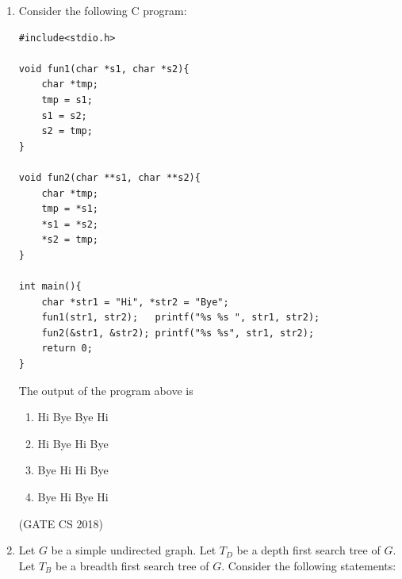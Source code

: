 \documentclass[12pt]{article}
\begin{document}
\begin{enumerate}
where $\psi(s,t,u,v,w,x,y)$ is a quantifier-free first-order logic formula using only predicate symbols, and possibly equality, but no function symbols. Suppose $\varphi$ has a model with a universe containing 7 elements.  

Which one of the following statements is necessarily true?  

\begin{enumerate}
\item There exists at least one model of $\varphi$ with universe of size less than or equal to 3.
\item There exists no model of $\varphi$ with universe of size less than or equal to 3.
\item There exists no model of $\varphi$ with universe of size greater than 7.
\item Every model of $\varphi$ has a universe of size equal to 7.
\end{enumerate}

(GATE CS 2018)

\item Consider the following C program:

\begin{verbatim}
#include<stdio.h>

void fun1(char *s1, char *s2){
    char *tmp;
    tmp = s1;
    s1 = s2;
    s2 = tmp;
}

void fun2(char **s1, char **s2){
    char *tmp;
    tmp = *s1;
    *s1 = *s2;
    *s2 = tmp;
}

int main(){
    char *str1 = "Hi", *str2 = "Bye";
    fun1(str1, str2);   printf("%s %s ", str1, str2);
    fun2(&str1, &str2); printf("%s %s", str1, str2);
    return 0;
}
\end{verbatim}

The output of the program above is

\begin{multicols}{2}
\begin{enumerate}
\item Hi Bye Bye Hi
\item Hi Bye Hi Bye
\item Bye Hi Hi Bye
\item Bye Hi Bye Hi
\end{enumerate}
\end{multicols}

(GATE CS 2018)

\item Let $G$ be a simple undirected graph. Let $T_D$ be a depth first search tree of $G$. Let $T_B$ be a breadth first search tree of $G$. Consider the following statements:


\end{enumerate}
\end{document}
